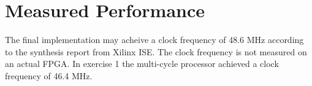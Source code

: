 \section{Measured Performance}
The final implementation may acheive a clock frequency of 48.6 MHz according to the synthesis report from Xilinx ISE.
The clock frequency is not measured on an actual FPGA.
In exercise 1 the multi-cycle processor achieved a clock frequency of 46.4 MHz.
